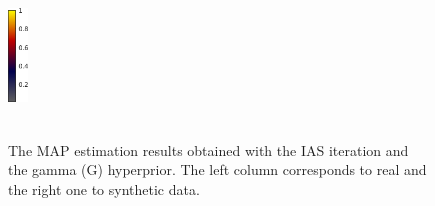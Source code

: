 \documentclass[5p]{elsarticle}
\begin{document}
\begin{figure}[h!]
\begin{footnotesize}
\begin{center}
\begin{minipage}{3cm}
\begin{center}
\end{center}\end{minipage}
\begin{minipage}{0.5cm} \begin{center}
\includegraphics[height=2.5cm]{colorbar.png} \\ \mbox{} \\ \mbox{}
\end{center}
\end{minipage}
\end{center}
\end{footnotesize}
\caption{The MAP estimation results obtained with the IAS iteration and the gamma (G) hyperprior. The left column corresponds to real and the right one to synthetic data.}
\label{fig:somatosensory_results_1} 
\end{figure}
\end{document}
